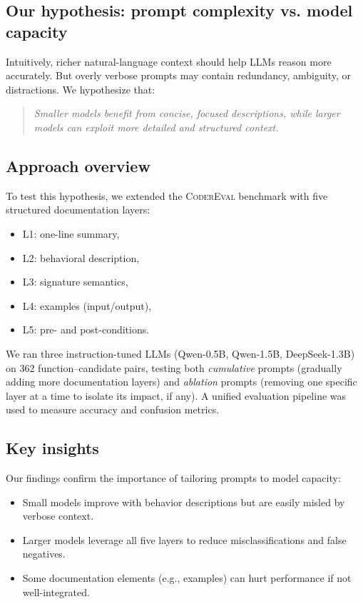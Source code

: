 \documentclass[a4paper]{usiinfbachelorproject}
\begin{document}
\subsection{Our hypothesis: prompt complexity vs. model capacity}

Intuitively, richer natural-language context should help LLMs reason more accurately. But overly verbose prompts may contain redundancy, ambiguity, or distractions. We hypothesize that:

\begin{quote}
\centering
\emph{Smaller models benefit from concise, focused descriptions, while larger models can exploit more detailed and structured context.}
\end{quote}

\subsection{Approach overview}

To test this hypothesis, we extended the \textsc{CoderEval} benchmark with five structured documentation layers:

\begin{itemize}[leftmargin=14pt]
  \item L1: one-line summary,
  \item L2: behavioral description,
  \item L3: signature semantics,
  \item L4: examples (input/output),
  \item L5: pre- and post-conditions.
\end{itemize}
We ran three instruction-tuned LLMs (Qwen-0.5B, Qwen-1.5B, DeepSeek-1.3B) on 362 function–candidate pairs, testing both \textit{cumulative} prompts (gradually adding more documentation layers) and \textit{ablation} prompts (removing one specific layer at a time to isolate its impact, if any). A unified evaluation pipeline was used to measure accuracy and confusion metrics.

\subsection{Key insights}

Our findings confirm the importance of tailoring prompts to model capacity:

\begin{itemize}[leftmargin=14pt]
  \item Small models improve with behavior descriptions but are easily misled by verbose context.
  \item Larger models leverage all five layers to reduce misclassifications and false negatives.
  \item Some documentation elements (e.g., examples) can hurt performance if not well-integrated.
\end{itemize}
\end{document}
